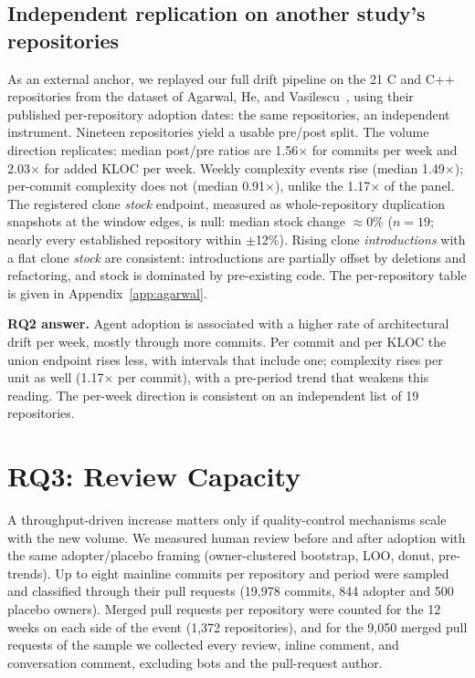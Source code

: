 \documentclass[sigplan,11pt,nonacm=true]{acmart}
\newcommand{\x}{$\times$}
\begin{document}
\subsection{Independent replication on another study's repositories}
\label{sec:agarwal-repl}

As an external anchor, we replayed our full drift pipeline on the 21 C and C++
repositories from the dataset of Agarwal, He, and
Vasilescu~\cite{agarwal2026}, using their published per-repository adoption
dates: the same repositories, an independent instrument. Nineteen
repositories yield a usable pre/post split. The volume direction replicates:
median post/pre ratios are 1.56\x{} for commits per week and 2.03\x{} for
added KLOC per week. Weekly complexity events rise (median 1.49\x);
per-commit complexity does not (median 0.91\x), unlike the 1.17\x{} of the
panel. The registered clone \emph{stock} endpoint,
measured as whole-repository duplication snapshots at the window edges, is
null: median stock change $\approx$0\% ($n=19$; nearly every established
repository within $\pm$12\%). Rising clone \emph{introductions} with a flat
clone \emph{stock} are consistent: introductions are partially offset by
deletions and refactoring, and stock is dominated by pre-existing code. The
per-repository table is given in Appendix~\ref{app:agarwal}.

\medskip
\noindent\textbf{RQ2 answer.} Agent adoption is associated with a higher rate
of architectural drift per week, mostly through more commits. Per commit and
per KLOC the union endpoint rises less, with intervals that include one;
complexity rises per unit as well (1.17\x{} per commit), with a pre-period
trend that weakens this reading. The per-week direction is consistent on an
independent list of 19 repositories.

\section{RQ3: Review Capacity}
\label{sec:rq3}

A throughput-driven increase matters only if quality-control mechanisms scale
with the new volume. We measured human review before and after adoption with
the same adopter/placebo framing (owner-clustered bootstrap, LOO, donut,
pre-trends). Up to eight mainline commits per repository and period were
sampled and classified through their pull requests (19{,}978 commits, 844
adopter and 500 placebo owners). Merged pull requests per repository were
counted for the 12 weeks on each side of the event (1{,}372 repositories), and
for the 9{,}050 merged pull requests of the sample we collected every review,
inline comment, and conversation comment, excluding bots and the pull-request
author.
\end{document}
